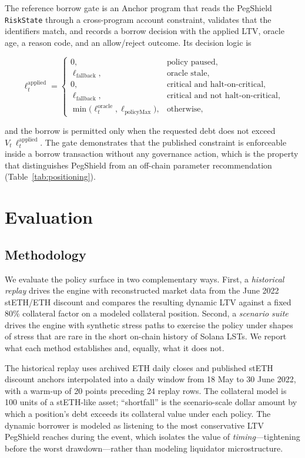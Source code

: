 \documentclass[aps,prx,reprint,nofootinbib,longbibliography]{revtex4-2}
\begin{document}
The reference borrow gate is an Anchor program that reads the PegShield
\texttt{RiskState} through a cross-program account constraint, validates that the
identifiers match, and records a borrow decision with the applied LTV, oracle age,
a reason code, and an allow/reject outcome. Its decision logic is
\begin{widetext}
\begin{equation}
\ell^{\mathrm{applied}}_t =
\begin{cases}
0, & \text{policy paused},\\
\ell_{\mathrm{fallback}}, & \text{oracle stale},\\
0, & \text{critical and halt-on-critical},\\
\ell_{\mathrm{fallback}}, & \text{critical and not halt-on-critical},\\
\min\!\bigl(\ell^{\mathrm{oracle}}_t,\ell_{\mathrm{policyMax}}\bigr), & \text{otherwise},
\end{cases}
\label{eq:gate}
\end{equation}
\end{widetext}
and the borrow is permitted only when the requested debt does not exceed
$V_t\,\ell^{\mathrm{applied}}_t$. The gate demonstrates that the published
constraint is enforceable inside a borrow transaction without any governance
action, which is the property that distinguishes PegShield from an off-chain
parameter recommendation (Table~\ref{tab:positioning}).

\section{Evaluation}
\label{sec:eval}

\subsection{Methodology}

We evaluate the policy surface in two complementary ways. First, a
\emph{historical replay} drives the engine with reconstructed market data from the
June 2022 stETH/ETH discount and compares the resulting dynamic LTV against a fixed
80\% collateral factor on a modeled collateral position. Second, a
\emph{scenario suite} drives the engine with synthetic stress paths to exercise the
policy under shapes of stress that are rare in the short on-chain history of Solana
LSTs. We report what each method establishes and, equally, what it does not.

The historical replay uses archived ETH daily closes and published stETH discount
anchors interpolated into a daily window from 18 May to 30 June 2022, with a
warm-up of 20 points preceding 24 replay rows. The collateral model is 100 units of
a stETH-like asset; ``shortfall'' is the scenario-scale dollar amount by which a
position's debt exceeds its collateral value under each policy. The dynamic
borrower is modeled as listening to the most conservative LTV PegShield reaches
during the event, which isolates the value of \emph{timing}---tightening before the
worst drawdown---rather than modeling liquidator microstructure.
\end{document}
